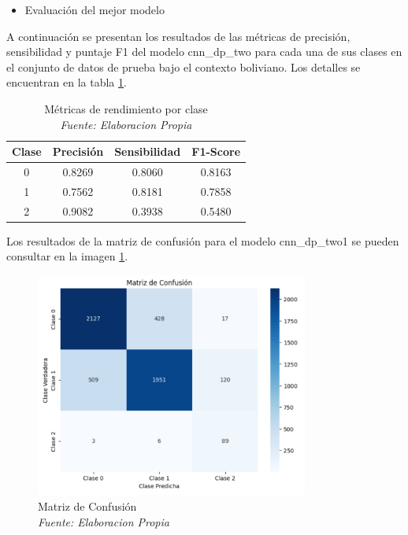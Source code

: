 \begin{itemize}
\item Evaluación del mejor modelo
\end{itemize}

A continuación se presentan los resultados de las métricas de precisión, sensibilidad y puntaje F1 del modelo cnn\_dp\_two para cada una de sus clases en el conjunto de datos de prueba bajo el contexto boliviano. Los detalles se encuentran en la tabla \ref{tbl:metrics}.

\begin{table}[!ht]
	\centering
	\begin{tabular}{|c|c|c|c|}
		\hline
		\textbf{Clase} & \textbf{Precisión} & \textbf{Sensibilidad} & \textbf{F1-Score} \\ \hline
		0 & 0.8269 & 0.8060 & 0.8163 \\ \hline
		1 & 0.7562 & 0.8181 & 0.7858 \\ \hline
		2 & 0.9082 & 0.3938 & 0.5480 \\ \hline
	\end{tabular}
	\caption[Métricas de rendimiento por clase]{Métricas de rendimiento por clase
		\\\textit{Fuente: Elaboracion Propia}}
	\label{tbl:metrics}
\end{table}


Los resultados de la matriz de confusión para el modelo cnn\_dp\_two1 se pueden consultar en la imagen \ref{fig:matriz}.


\begin{figure}[!h]
	\includegraphics[width=0.8\textwidth]{capitulo5/figuras/matriz_confusion.PNG}
	\caption[Matriz de Confusión]{Matriz de Confusión
		\\\textit{Fuente: Elaboracion Propia}}
	\label{fig:matriz}
\end{figure}

